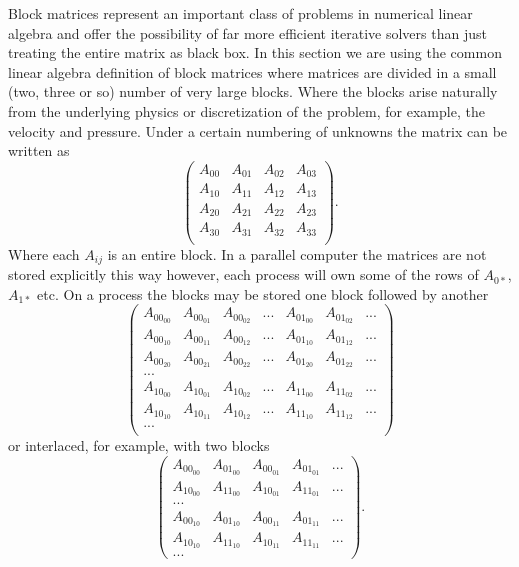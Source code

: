 Block matrices represent an important class of problems in numerical
linear algebra and offer the possibility of far more efficient
iterative solvers than just treating the entire matrix as black box. In
this section we are using the common linear algebra definition of
block matrices where matrices are divided in a small (two, three or
so) number of very large blocks. Where the blocks arise naturally from
the underlying physics or discretization of the problem, for example, the velocity and pressure. Under a
certain numbering of unknowns the matrix can be written as
\[
\left( \begin{array}{cccc}
A_{00}   & A_{01} & A_{02} & A_{03} \\
A_{10}   & A_{11} & A_{12} & A_{13} \\
A_{20}   & A_{21} & A_{22} & A_{23} \\
A_{30}   & A_{31} & A_{32} & A_{33} \\
\end{array} \right).
\]
Where each $ A_{ij}$ is an entire block.
In a parallel computer the matrices are not stored explicitly this way
however, each process will own some of the rows of $A_{0*}$, $A_{1*}$
etc. On a process the blocks may be stored one block followed by another
\[
\left( \begin{array}{ccccccc}
A_{{00}_{00}}   & A_{{00}_{01}} & A_{{00}_{02}} & ... & A_{{01}_{00}} & A_{{01}_{02}} & ...  \\
A_{{00}_{10}}   & A_{{00}_{11}} & A_{{00}_{12}} & ... & A_{{01}_{10}} & A_{{01}_{12}} & ... \\
A_{{00}_{20}}   & A_{{00}_{21}} & A_{{00}_{22}} & ... & A_{{01}_{20}} & A_{{01}_{22}}  & ...\\
... \\
A_{{10}_{00}}   & A_{{10}_{01}} & A_{{10}_{02}} & ... & A_{{11}_{00}} & A_{{11}_{02}}  & ... \\
A_{{10}_{10}}   & A_{{10}_{11}} & A_{{10}_{12}} & ... & A_{{11}_{10}} & A_{{11}_{12}}  & ... \\
... \\
\end{array} \right)
\]
or interlaced, for example, with two blocks
\[
\left( \begin{array}{ccccc}
A_{{00}_{00}}   & A_{{01}_{00}} &  A_{{00}_{01}} & A_{{01}_{01}} &  ... \\
A_{{10}_{00}}   & A_{{11}_{00}} &  A_{{10}_{01}} & A_{{11}_{01}} &  ... \\
... \\
A_{{00}_{10}}   & A_{{01}_{10}} & A_{{00}_{11}} & A_{{01}_{11}} & ...\\
A_{{10}_{10}}   & A_{{11}_{10}} & A_{{10}_{11}} & A_{{11}_{11}} & ...\\
...
\end{array} \right).
\]
